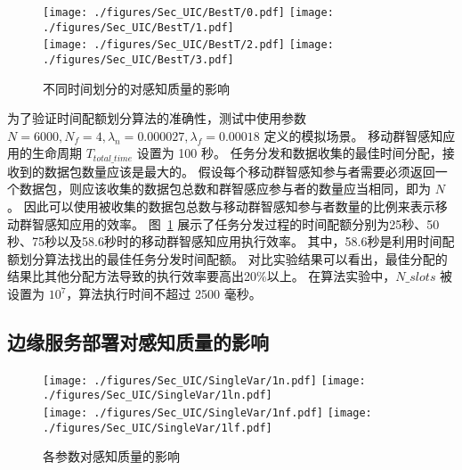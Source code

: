 \begin{figure}[!h]
  \centering
  {\texttt{[image: ./figures/Sec\_UIC/BestT/0.pdf]}}
  {\texttt{[image: ./figures/Sec\_UIC/BestT/1.pdf]}}\\
  {\texttt{[image: ./figures/Sec\_UIC/BestT/2.pdf]}}
  {\texttt{[image: ./figures/Sec\_UIC/BestT/3.pdf]}}
  \vspace{-1em}
  \caption{不同时间划分的对感知质量的影响}
  \label{Figure_BestT}
\end{figure}

为了验证时间配额划分算法的准确性，测试中使用参数 $N=6000, N_f=4, \lambda_n = 0.000027, \lambda_f=0.00018$ 定义的模拟场景。
移动群智感知应用的生命周期 $T_{total\_time}$ 设置为 100 秒。
任务分发和数据收集的最佳时间分配，接收到的数据包数量应该是最大的。
假设每个移动群智感知参与者需要必须返回一个数据包，则应该收集的数据包总数和群智感应参与者的数量应当相同，即为 $N$。
因此可以使用被收集的数据包总数与移动群智感知参与者数量的比例来表示移动群智感知应用的效率。
图~\ref{Figure_BestT} 展示了任务分发过程的时间配额分别为25秒、50秒、75秒以及58.6秒时的移动群智感知应用执行效率。
其中，58.6秒是利用时间配额划分算法找出的最佳任务分发时间配额。
对比实验结果可以看出，最佳分配的结果比其他分配方法导致的执行效率要高出20\%以上。
在算法实验中，$N\_slots$ 被设置为 $10^7$，算法执行时间不超过 2500 毫秒。



\subsection{边缘服务部署对感知质量的影响}


\begin{figure}[!h]
  \centering
	{\texttt{[image: ./figures/Sec\_UIC/SingleVar/1n.pdf]}}
	{\texttt{[image: ./figures/Sec\_UIC/SingleVar/1ln.pdf]}}\\
	{\texttt{[image: ./figures/Sec\_UIC/SingleVar/1nf.pdf]}}
	{\texttt{[image: ./figures/Sec\_UIC/SingleVar/1lf.pdf]}}
	\vspace{-1em}
	\caption{各参数对感知质量的影响}
	\label{Figure_SingleValTest}
\end{figure}

